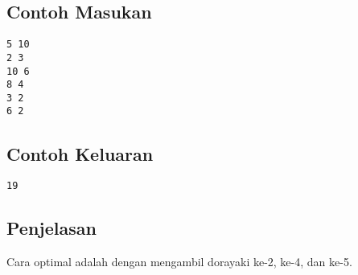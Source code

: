 \documentclass{article}
\begin{document}
\begin{multicols}{2}
\subsection*{Contoh Masukan}
\begin{lstlisting}
5 10
2 3
10 6
8 4
3 2
6 2

\end{lstlisting}
\columnbreak
\subsection*{Contoh Keluaran}
\begin{lstlisting}
19
\end{lstlisting}
\vfill
\null
\end{multicols}

\subsection*{Penjelasan}

Cara optimal adalah dengan mengambil dorayaki ke-2, ke-4, dan ke-5.
\end{document}
